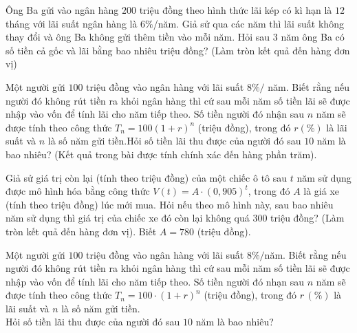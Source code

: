 \begin{bt}%
	 Ông Ba gửi vào ngân hàng $200$ triệu đồng theo hình thức lãi kép có kì hạn là $12$ tháng với lãi suất ngân hàng là $6\%$/năm. Giả sử qua các năm thì lãi suất không thay đổi và ông Ba không gửi thêm tiền vào mỗi năm. Hỏi sau $3$ năm ông Ba có số tiền cả gốc và lãi bằng bao nhiêu triệu đồng? (Làm tròn kết quả đến hàng đơn vị)
\end{bt}

\begin{bt}%
	Một người gửi $100$ triệu đồng vào ngân hàng với lãi suất $8\% /$ năm. Biết rằng nếu người đó không rút tiền ra khỏi ngân hàng thì cứ sau mỗi năm số tiền lãi sẽ được nhập vào vốn để tính lãi cho năm tiếp theo. Số tiền người đó nhận sau $n$ năm sẽ được tính theo công thức $T_n=100(1+r)^n$ (triệu đồng), trong đó $r(\%)$ là lãi suất và $n$ là số năm gửi tiền.Hỏi số tiền lãi thu được của người đó  sau $10$ năm là bao nhiêu? (Kết quả trong bài được tính chính xác đến hàng phần trăm).
\end{bt}

\begin{bt}%
	Giả sử giá trị còn lại (tính theo triệu đồng) của một chiếc ô tô sau $t$ năm  sử dụng được mô hình hóa bằng công thức $V(t)=A\cdot (0{,}905)^t$, trong đó $A$ là giá xe (tính theo triệu đồng) lúc mới mua. Hỏi nếu theo mô hình này, sau bao nhiêu năm sử dụng thì giá trị của chiếc xe đó còn lại không quá $300$ triệu đồng? (Làm tròn kết quả đến hàng đơn vị). Biết $A=780$ (triệu đồng).
\end{bt}

\begin{bt}%
	Một người gửi $100$ triệu đồng vào ngân hàng với lãi suất $8\%/$năm. Biết rằng nếu người đó không rút tiền ra khỏi ngân hàng thì cứ sau mỗi năm số tiền lãi sẽ được nhập vào vốn để tính lãi cho năm tiếp theo.  Số tiền người đó nhạn sau $n$ năm sẽ được tính theo công thức $T_n=100\cdot (1+r)^{n}$ (triệu đồng), trong đó $r\,(\%)$ là lãi suất và $n$ là số năm gửi tiền.\\
	Hỏi số tiền lãi thu được của người đó sau $10$ năm là bao  nhiêu?
\end{bt}

